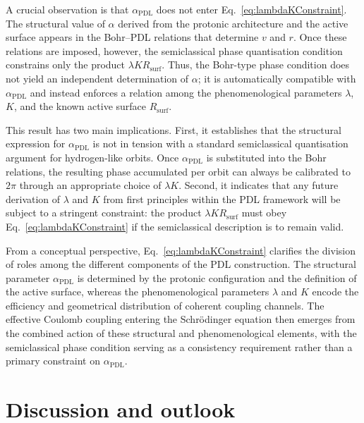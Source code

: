 \documentclass[11pt,a4paper]{article}
\begin{document}
A crucial observation is that $\alpha_{\mathrm{PDL}}$ does not enter Eq.~\eqref{eq:lambdaKConstraint}. The structural value of $\alpha$ derived from the protonic architecture and the active surface appears in the Bohr--PDL relations that determine $v$ and $r$. Once these relations are imposed, however, the semiclassical phase quantisation condition constrains only the product $\lambda K R_{\mathrm{surf}}$. Thus, the Bohr-type phase condition does not yield an independent determination of $\alpha$; it is automatically compatible with $\alpha_{\mathrm{PDL}}$ and instead enforces a relation among the phenomenological parameters $\lambda$, $K$, and the known active surface $R_{\mathrm{surf}}$.\par

This result has two main implications. First, it establishes that the structural expression for $\alpha_{\mathrm{PDL}}$ is not in tension with a standard semiclassical quantisation argument for hydrogen-like orbits. Once $\alpha_{\mathrm{PDL}}$ is substituted into the Bohr relations, the resulting phase accumulated per orbit can always be calibrated to $2\pi$ through an appropriate choice of $\lambda K$. Second, it indicates that any future derivation of $\lambda$ and $K$ from first principles within the PDL framework will be subject to a stringent constraint: the product $\lambda K R_{\mathrm{surf}}$ must obey Eq.~\eqref{eq:lambdaKConstraint} if the semiclassical description is to remain valid.\par

From a conceptual perspective, Eq.~\eqref{eq:lambdaKConstraint} clarifies the division of roles among the different components of the PDL construction. The structural parameter $\alpha_{\mathrm{PDL}}$ is determined by the protonic configuration and the definition of the active surface, whereas the phenomenological parameters $\lambda$ and $K$ encode the efficiency and geometrical distribution of coherent coupling channels. The effective Coulomb coupling entering the Schr\"odinger equation then emerges from the combined action of these structural and phenomenological elements, with the semiclassical phase condition serving as a consistency requirement rather than a primary constraint on $\alpha_{\mathrm{PDL}}$.

\section{Discussion and outlook}
\label{sec:Discussion}
\end{document}
